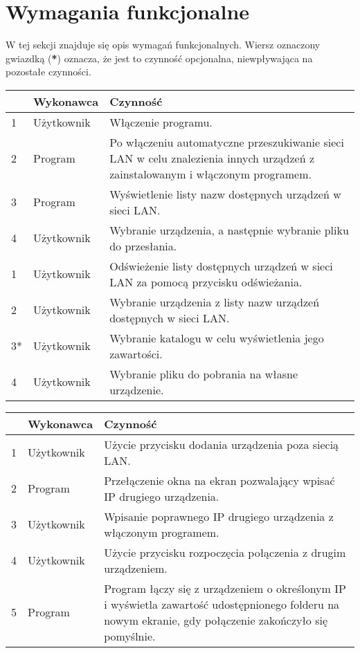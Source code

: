 \documentclass[12pt,a4paper]{article}
\begin{document}
\section{Wymagania funkcjonalne}
W tej sekcji znajduje się opis wymagań funkcjonalnych. Wiersz oznaczony gwiazdką (\textbf{*}) oznacza, że jest to czynność opcjonalna, niewpływająca na pozostałe czynności.

\begin{center}
	\begin{tabular}{|l|p{5em}|p{30em}|}
	\hline 
	 & Wykonawca & Czynność \\ 
	\hline
	1 & Użytkownik & Włączenie programu. \\
	\hline
	2 & Program & Po włączeniu automatyczne przeszukiwanie sieci LAN w celu znalezienia innych urządzeń z zainstalowanym i włączonym programem. \\
	\hline
	3 & Program & Wyświetlenie listy nazw dostępnych urządzeń w sieci LAN. \\
	\hline
	4 & Użytkownik & Wybranie urządzenia, a następnie wybranie pliku do przesłania. \\
	\hline
	\hline 
	1 & Użytkownik & Odświeżenie listy dostępnych urządzeń w sieci LAN za pomocą przycisku odświeżania. \\ 
	\hline 
	2 & Użytkownik & Wybranie urządzenia z listy nazw urządzeń dostępnych w sieci LAN. \\ 
	\hline 
	3* & Użytkownik & Wybranie katalogu w celu wyświetlenia jego zawartości. \\
	\hline
	4 & Użytkownik & Wybranie pliku do pobrania na własne urządzenie. \\
	\hline
	\end{tabular}
	
	\begin{tabular}{|l|p{5em}|p{30em}|}
	\hline 
	 & Wykonawca & Czynność \\
	\hline
	1 & Użytkownik & Użycie przycisku dodania urządzenia poza siecią LAN. \\
	\hline
	2 & Program & Przełączenie okna na ekran pozwalający wpisać IP drugiego urządzenia.\\
	\hline
	3 & Użytkownik & Wpisanie poprawnego IP drugiego urządzenia z włączonym programem. \\
	\hline
	4 & Użytkownik & Użycie przycisku rozpoczęcia połączenia z drugim urządzeniem. \\ 
	\hline
	5 & Program & Program łączy się z urządzeniem o określonym IP i wyświetla zawartość udostępnionego folderu na nowym ekranie, gdy połączenie zakończyło się pomyślnie. \\
	\hline
	\end{tabular} 
\end{center}
\end{document}
